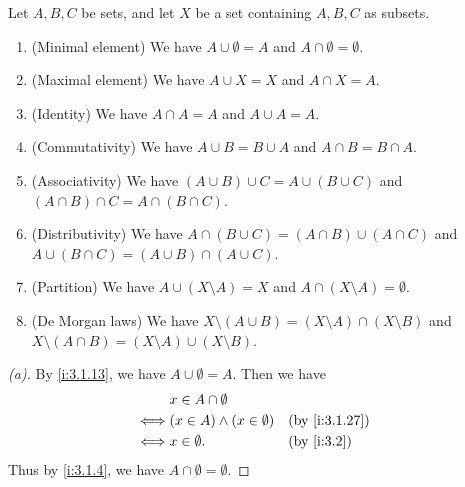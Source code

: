 \begin{prop}\label{i:3.1.28}
  Let \(A, B, C\) be sets, and let \(X\) be a set containing \(A, B, C\) as subsets.
  \begin{enumerate}
    \item (Minimal element) We have \(A \cup \emptyset = A\) and \(A \cap \emptyset = \emptyset\).
    \item (Maximal element) We have \(A \cup X = X\) and \(A \cap X = A\).
    \item (Identity) We have \(A \cap A = A\) and \(A \cup A = A\).
    \item (Commutativity) We have \(A \cup B = B \cup A\) and \(A \cap B = B \cap A\).
    \item (Associativity) We have \((A \cup B) \cup C = A \cup (B \cup C)\) and \((A \cap B) \cap C = A \cap (B \cap C)\).
    \item (Distributivity) We have \(A \cap (B \cup C) = (A \cap B) \cup (A \cap C)\) and \(A \cup (B \cap C) = (A \cup B) \cap (A \cup C)\).
    \item (Partition) We have \(A \cup (X \setminus A) = X\) and \(A \cap (X \setminus A) = \emptyset\).
    \item (De Morgan laws) We have \(X \setminus (A \cup B) = (X \setminus A) \cap (X \setminus B)\) and \(X \setminus (A \cap B) = (X \setminus A) \cup (X \setminus B)\).
  \end{enumerate}
\end{prop}

\begin{proof}[(a)]
  By \cref{i:3.1.13}, we have \(A \cup \emptyset = A\).
  Then we have
  \begin{align*}
         & x \in A \cap \emptyset                               \\
    \iff & (x \in A) \land (x \in \emptyset) &  & \by{i:3.1.27} \\
    \iff & x \in \emptyset.                  &  & \by{i:3.2}
  \end{align*}
  Thus by \cref{i:3.1.4}, we have \(A \cap \emptyset = \emptyset\).
\end{proof}

